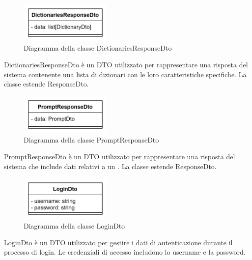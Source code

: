  \label{DictionariesResponseDto}
\begin{figure}[H]
    \centering
    \includegraphics[width=0.4\textwidth]{assets/Backend/dictionaries_response_dto.png}
    \caption{Diagramma della classe DictionariesResponseDto}
  \end{figure}
\par DictionariesResponseDto è un DTO utilizzato per rappresentare una risposta del sistema contenente una lista di dizionari con le loro caratteristiche specifiche. La classe estende ResponseDto.

 \label{PromptResponseDto}
\begin{figure}[H]
    \centering
    \includegraphics[width=0.4\textwidth]{assets/Backend/prompt_response_dto.png}
    \caption{Diagramma della classe PromptResponseDto}
  \end{figure}
\par PromptResponseDto è un DTO utilizzato per rappresentare una risposta del sistema che include dati relativi a un . La classe estende ResponseDto.

 \label{LoginDto}
\begin{figure}[H]
    \centering
    \includegraphics[width=0.4\textwidth]{assets/Backend/login_dto.png}
    \caption{Diagramma della classe LoginDto}
  \end{figure}
\par LoginDto è un DTO utilizzato per gestire i dati di autenticazione durante il processo di login. Le credenziali di accesso includono lo username e la password.

